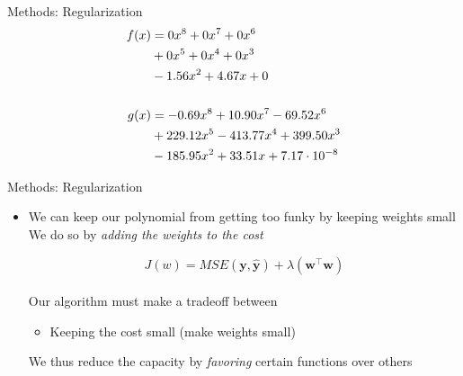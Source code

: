 \begin{slide}{Methods: Regularization}
  \begin{align*}
  f(x) &= 0x^8 + 0x^7 + 0x^6\\
       &+ 0x^5 + 0x^4 + 0x^3\\
       &- 1.56x^2  + 4.67x + 0\\
  \vspace{1cm}\\
  g(x) &= -0.69 x^8 + 10.90 x^7 - 69.52 x^6\\
       &+ 229.12 x^5 - 413.77  x^4 + 399.50 x^3\\
       &- 185.95 x^2 + 33.51 x + 7.17 \cdot 10^{-8}
  \end{align*}
\end{slide}

\begin{slide}{Methods: Regularization}
  \begin{itemize}
    \item We can keep our polynomial from getting too funky by keeping weights small
    \pitem We do so by \emph{adding the weights to the cost}

    $$J(w) = MSE(\mathbf{y}, \mathbf{\hat{y}}) + \lambda (\mathbf{w}^\top\mathbf{w})$$\\
    \vspace{0.1cm}
    \pitem Our algorithm must make a tradeoff between
    \begin{itemize}
      \pitem Minimizing the training error (make weights large)
      \item Keeping the cost small (make weights small)
    \end{itemize}
    \pitem We thus reduce the capacity by \emph{favoring} certain functions over others
  \end{itemize}
\end{slide}
